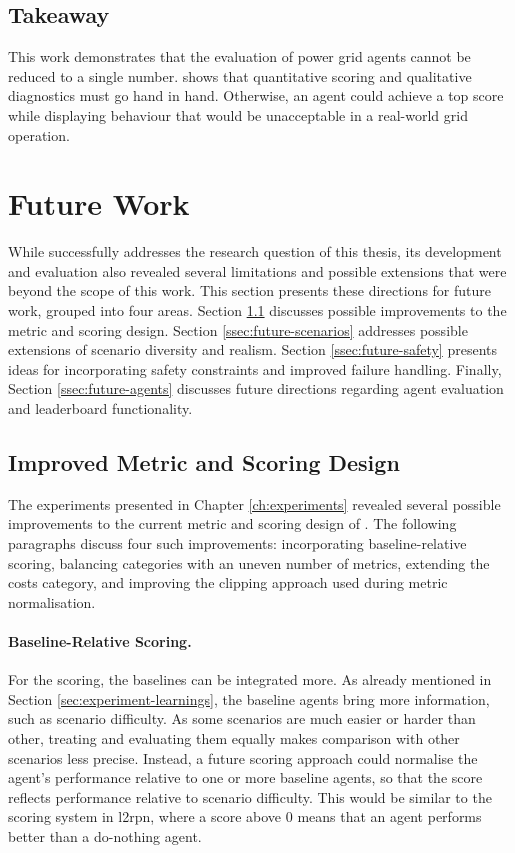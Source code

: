\subsection{Takeaway}\label{ssec:contribution-takeaway}
This work demonstrates that the evaluation of power grid agents cannot be reduced to a single number. \benchmark shows that quantitative scoring and qualitative diagnostics must go hand in hand. Otherwise, an agent could achieve a top score while displaying behaviour that would be unacceptable in a real-world grid operation.







\section{Future Work}\label{sec:future-work}
While \benchmark successfully addresses the research question of this thesis, its development and evaluation also revealed several limitations and possible extensions that were beyond the scope of this work. This section presents these directions for future work, grouped into four areas. Section \ref{ssec:future-metrics} discusses possible improvements to the metric and scoring design. Section \ref{ssec:future-scenarios} addresses possible extensions of scenario diversity and realism. Section \ref{ssec:future-safety} presents ideas for incorporating safety constraints and improved failure handling. Finally, Section \ref{ssec:future-agents} discusses future directions regarding agent evaluation and leaderboard functionality.



\subsection{Improved Metric and Scoring Design}\label{ssec:future-metrics}
The experiments presented in Chapter \ref{ch:experiments} revealed several possible improvements to the current metric and scoring design of \benchmark. The following paragraphs discuss four such improvements: incorporating baseline-relative scoring, balancing categories with an uneven number of metrics, extending the costs category, and improving the clipping approach used during metric normalisation.

\paragraph{Baseline-Relative Scoring.}
For the scoring, the baselines can be integrated more. As already mentioned in Section \ref{sec:experiment-learnings}, the baseline agents bring more information, such as scenario difficulty. As some scenarios are much easier or harder than other, treating and evaluating them equally makes comparison with other scenarios less precise. Instead, a future scoring approach could normalise the agent's performance relative to one or more baseline agents, so that the score reflects performance relative to scenario difficulty. This would be similar to the scoring system in \ac{l2rpn}, where a score above 0 means that an agent performs better than a do-nothing agent.

